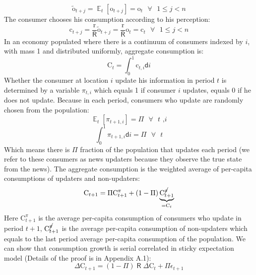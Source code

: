 \documentclass[12pt,letterpaper]{article}
\DeclareMathOperator{\E}{\mathbb{E}}
\DeclareMathOperator{\R}{\mathsf{R}}
\begin{document}
\begin{equation*}
\tilde{\mathrm{o}}_{t+j}=\E_{t}\left[\mathrm{o}_{t+j}\right]=\mathrm{o}_{t}\text{  }\forall\text{  }1\leq j<n
\end{equation*}
The consumer chooses his consumption according to his perception:
\begin{equation*}
\mathrm{c}_{t+j}=\frac{\mathrm{r}}{\R}\tilde{\mathrm{o}}_{t+j}=\frac{\mathrm{r}}{\R}\mathrm{o}_{t}=\mathrm{c}_{t}\text{  }\forall\text{  }1\leq j<n
\end{equation*}
In an economy populated where there is a continuum of consumers indexed by $i$, with mass 1 and distributed uniformly, aggregate consumption is:
\begin{equation*}
\mathrm{C}_{t}=\int_{0}^{1}\mathrm{c}_{t,i}\mathsf{d}i
\end{equation*}
Whether the consumer at location $i$ update his information in period $t$ is determined by a variable $\pi_{t,i}$ which equals 1 if consumer $i$ updates, equals 0 if he does not update. Because in each period, consumers who update are randomly chosen from the population:
\begin{equation}
\E_{t}\left[\pi_{t+1,i}\right]=\Pi\text{  }\forall\text{  }t\text{ ,}i
\end{equation}
\begin{equation}
\int_{0}^{1}\pi_{t+1,i}\mathsf{d}i=\Pi\text{ }\forall\text{  }t
\end{equation}
Which means there is $\Pi$ fraction of the population that updates each period (we refer to these consumers as news updaters because they observe the true state from the news). The aggregate consumption is the weighted average of per-capita consumptions of updaters and non-updaters:
\begin{equation} \label{Toy:StickyE}
\mathrm{C}_{t+1}=\Pi\mathrm{C}^{\pi}_{t+1}+\left(1-\Pi\right)\underbrace{\mathrm{C}^{\cancel{\pi}}_{t+1}}_{=\mathrm{C}_{t}}
\end{equation}
Here $\mathrm{C}^{\pi}_{t+1}$ is the average per-capita consumption of consumers who update in period $t+1$, $\mathrm{C}^{\cancel{\pi}}_{t+1}$ is the average per-capita consumption of non-updaters which equals to the last period average per-capita consumption of the population. We can show that consumption growth is serial correlated in sticky expectation model (Details of the proof is in Appendix A.1):
\begin{equation} \label{Toy:AggC}
\Delta\mathrm{C}_{t+1}=(1-\Pi)\R\Delta\mathrm{C}_{t}+\Pi\epsilon_{t+1}
\end{equation}
\end{document}
